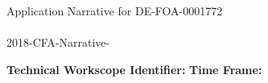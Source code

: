 \documentclass[dvips,12pt]{article}
\begin{document}
\begin{centering} Application Narrative for
  DE-FOA-0001772\\
  \textbf{\large \mytitle}\\
  2018-CFA-Narrative-\ID\\
\end{centering}

\vspace{1em}

\noindent\textbf{Technical Workscope Identifier:} \workscope \hspace{.5in}
\textbf{Time Frame:} \timeframe


















\label{LastPage} 
\end{document}
